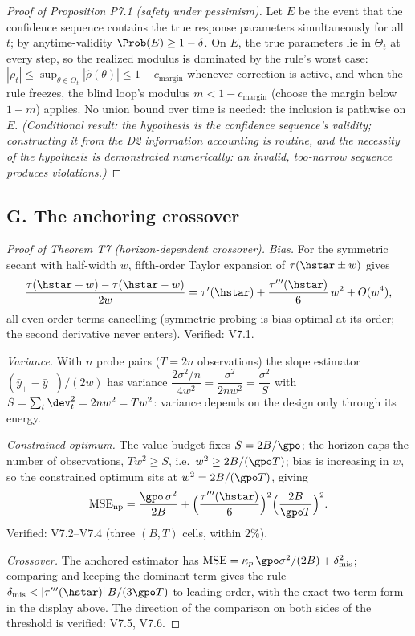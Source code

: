 \begin{proof}[Proof of Proposition P7.1 (safety under pessimism)]
Let $E$ be the event that the confidence sequence contains the true
response parameters simultaneously for all $t$; by anytime-validity
$\Prob(E) \ge 1-\delta$. On $E$, the true parameters lie in $\Theta_t$ at
every step, so the realized modulus is dominated by the rule's worst case:
$|\rho_t| \le \sup_{\theta\in\Theta_t}|\hat\rho(\theta)| \le 1 -
c_{\mathrm{margin}}$ whenever correction is active, and when the rule
freezes, the blind loop's modulus $m < 1 - c_{\mathrm{margin}}$ (choose the
margin below $1 - m$) applies. No union bound over time is needed: the
inclusion is pathwise on $E$. \emph{(Conditional result: the hypothesis is
the confidence sequence's validity; constructing it from the D2
information accounting is routine, and the necessity of the hypothesis is
demonstrated numerically: an invalid, too-narrow sequence produces
violations.)}
\end{proof}

\subsection*{G. The anchoring crossover}

\begin{proof}[Proof of Theorem T7 (horizon-dependent crossover)]
\emph{Bias.} For the symmetric secant with half-width $w$, fifth-order
Taylor expansion of $\tau(\hstar \pm w)$ gives
\[
\frac{\tau(\hstar + w) - \tau(\hstar - w)}{2w}
 = \tau'(\hstar) + \frac{\tau'''(\hstar)}{6}\,w^2 + O(w^4),
\]
all even-order terms cancelling (symmetric probing is bias-optimal at its
order; the second derivative never enters). Verified: V7.1.

\emph{Variance.} With $n$ probe pairs ($T = 2n$ observations) the slope
estimator $(\bar y_+ - \bar y_-)/(2w)$ has variance
$\dfrac{2\sigma^2/n}{4w^2} = \dfrac{\sigma^2}{2nw^2} = \dfrac{\sigma^2}{S}$ with
$S = \sum_t \dev_t^2 = 2n w^2 = T w^2$: variance depends on the design only
through its energy.

\emph{Constrained optimum.} The value budget fixes $S = 2B/\gpo$; the
horizon caps the number of observations, $T w^2 \ge S$, i.e.\
$w^2 \ge 2B/(\gpo T)$; bias is increasing in $w$, so the constrained
optimum sits at $w^2 = 2B/(\gpo T)$, giving
\[
\mathrm{MSE}_{\mathrm{np}} = \frac{\gpo\,\sigma^2}{2B}
 + \Big(\frac{\tau'''(\hstar)}{6}\Big)^2\Big(\frac{2B}{\gpo T}\Big)^2 .
\]
Verified: V7.2--V7.4 (three $(B, T)$ cells, within $2\%$).

\emph{Crossover.} The anchored estimator has
$\mathrm{MSE} = \kappa_p\,\gpo\sigma^2/(2B) + \delta_{\mathrm{mis}}^2$;
comparing and keeping the dominant term gives the rule
$\delta_{\mathrm{mis}} < |\tau'''(\hstar)|\,B/(3\gpo T)$ to leading order,
with the exact two-term form in the display above. The direction of the
comparison on both sides of the threshold is verified: V7.5, V7.6.
\end{proof}

